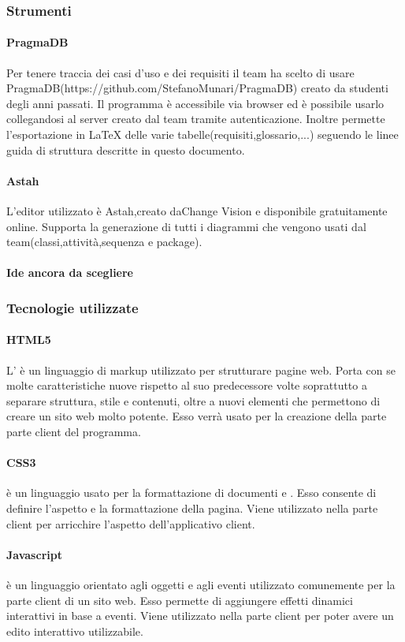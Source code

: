 	\subsubsection{Strumenti}
		\paragraph{PragmaDB}
		Per tenere traccia dei casi d'uso e dei requisiti il team ha scelto di usare PragmaDB(https://github.com/StefanoMunari/PragmaDB) creato da studenti degli anni passati. Il programma è accessibile via browser ed è possibile usarlo collegandosi al server creato dal team tramite autenticazione. Inoltre permette l'esportazione in \LaTeX{} delle varie tabelle(requisiti,glossario,...) seguendo le linee guida di struttura descritte in questo documento.
		\paragraph{Astah}
		L'editor  utilizzato è Astah,creato daChange Vision e disponibile gratuitamente online. Supporta la generazione di tutti i diagrammi che vengono usati dal team(classi,attività,sequenza e package).
		\paragraph{Ide ancora da scegliere}
	\subsubsection{Tecnologie utilizzate}
	\paragraph{HTML5}
	L' è un linguaggio di markup utilizzato per strutturare pagine web. Porta con se molte caratteristiche nuove rispetto al suo predecessore volte soprattutto a separare struttura, stile e contenuti, oltre a nuovi elementi che permettono di creare un sito web molto potente.
	Esso verrà usato per la creazione della parte parte client del programma.
	\paragraph{CSS3}
	 è un linguaggio usato per la formattazione di documenti  e . Esso consente di definire l'aspetto e la formattazione della pagina. Viene utilizzato nella parte client per arricchire l'aspetto dell'applicativo client.
	\paragraph{Javascript}
	 è un linguaggio orientato agli oggetti e agli eventi utilizzato comunemente per la parte client di un sito web. Esso permette di aggiungere effetti dinamici interattivi in base a eventi.
	Viene utilizzato nella parte client per poter avere un edito interattivo utilizzabile.%
